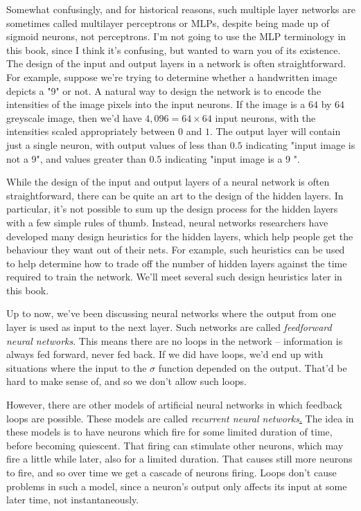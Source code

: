 \documentclass[a4paper,12pt]{report}%
\begin{document}
Somewhat confusingly, and for historical reasons, such multiple layer networks are sometimes called multilayer perceptrons or MLPs, despite being made up of sigmoid neurons, not perceptrons. I'm not going to use the MLP terminology in this book, since I think it's confusing, but wanted to warn you of its existence.
The design of the input and output layers in a network is often straightforward. For example, suppose we're trying to determine whether a handwritten image depicts a "9" or not. A natural way to design the network is to encode the intensities of the image pixels into the input neurons. If the image is a $64$ by $64$ greyscale image, then we'd have $4,096=64\times64$ input neurons, with the intensities scaled appropriately between $0$ and $1$. The output layer will contain just a single neuron, with output values of less than $0.5$ indicating "input image is not a 9", and values greater than $0.5$ indicating "input image is a 9 ".

While the design of the input and output layers of a neural network is often straightforward, there can be quite an art to the design of the hidden layers. In particular, it's not possible to sum up the design process for the hidden layers with a few simple rules of thumb. Instead, neural networks researchers have developed many design heuristics for the hidden layers, which help people get the behaviour they want out of their nets. For example, such heuristics can be used to help determine how to trade off the number of hidden layers against the time required to train the network. We'll meet several such design heuristics later in this book.

Up to now, we've been discussing neural networks where the output from one layer is used as input to the next layer. Such networks are called {\it feedforward neural networks}. This means there are no loops in the network -- information is always fed forward, never fed back. If we did have loops, we'd end up with situations where the input to the $\sigma$ function depended on the output. That'd be hard to make sense of, and so we don't allow such loops.

However, there are other models of artificial neural networks in which feedback loops are possible. These models are called {\it recurrent neural networks}\href{https://en.wikipedia.org/wiki/Recurrent_neural_network}. The idea in these models is to have neurons which fire for some limited duration of time, before becoming quiescent. That firing can stimulate other neurons, which may fire a little while later, also for a limited duration. That causes still more neurons to fire, and so over time we get a cascade of neurons firing. Loops don't cause problems in such a model, since a neuron's output only affects its input at some later time, not instantaneously.
\end{document}
